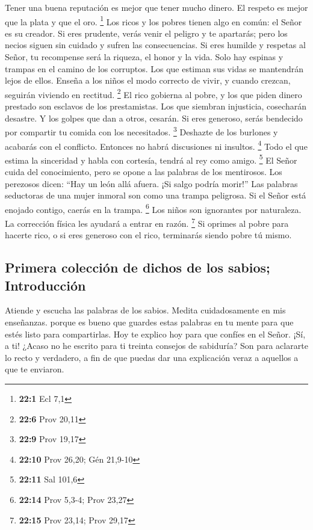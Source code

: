  Tener una buena reputación es mejor que tener mucho dinero.
El respeto es mejor que la plata y que el oro. \footnote{\textbf{22:1}
  Ecl 7,1}  Los ricos y los pobres tienen algo en común: el
Señor es su creador.  Si eres prudente, verás venir el
peligro y te apartarás; pero los necios siguen sin cuidado y sufren las
consecuencias.  Si eres humilde y respetas al Señor, tu
recompense será la riqueza, el honor y la vida.  Solo hay
espinas y trampas en el camino de los corruptos. Los que estiman sus
vidas se mantendrán lejos de ellos.  Enseña a los niños el
modo correcto de vivir, y cuando crezcan, seguirán viviendo en rectitud.
\footnote{\textbf{22:6} Prov 20,11}  El rico gobierna al
pobre, y los que piden dinero prestado son esclavos de los prestamistas.
 Los que siembran injusticia, cosecharán desastre. Y los
golpes que dan a otros, cesarán.  Si eres generoso, serás
bendecido por compartir tu comida con los necesitados. \footnote{\textbf{22:9}
  Prov 19,17}  Deshazte de los burlones y acabarás con el
conflicto. Entonces no habrá discusiones ni insultos. \footnote{\textbf{22:10}
  Prov 26,20; Gén 21,9-10}  Todo el que estima la
sinceridad y habla con cortesía, tendrá al rey como amigo. \footnote{\textbf{22:11}
  Sal 101,6}  El Señor cuida del conocimiento, pero se
opone a las palabras de los mentirosos.  Los perezosos
dicen: ``Hay un león allá afuera. ¡Si salgo podría morir!''
 Las palabras seductoras de una mujer inmoral son como una
trampa peligrosa. Si el Señor está enojado contigo, caerás en la trampa.
\footnote{\textbf{22:14} Prov 5,3-4; Prov 23,27}  Los niños
son ignorantes por naturaleza. La corrección física les ayudará a entrar
en razón. \footnote{\textbf{22:15} Prov 23,14; Prov 29,17} 
Si oprimes al pobre para hacerte rico, o si eres generoso con el rico,
terminarás siendo pobre tú mismo.

\hypertarget{primera-colecciuxf3n-de-dichos-de-los-sabios-introducciuxf3n}{%
\subsection{Primera colección de dichos de los sabios;
Introducción}\label{primera-colecciuxf3n-de-dichos-de-los-sabios-introducciuxf3n}}

 Atiende y escucha las palabras de los sabios. Medita
cuidadosamente en mis enseñanzas.  porque es bueno que
guardes estas palabras en tu mente para que estés listo para
compartirlas.  Hoy te explico hoy para que confíes en el
Señor. ¡Sí, a ti!  ¿Acaso no he escrito para ti treinta
consejos de sabiduría?  Son para aclararte lo recto y
verdadero, a fin de que puedas dar una explicación veraz a aquellos a
que te enviaron.

